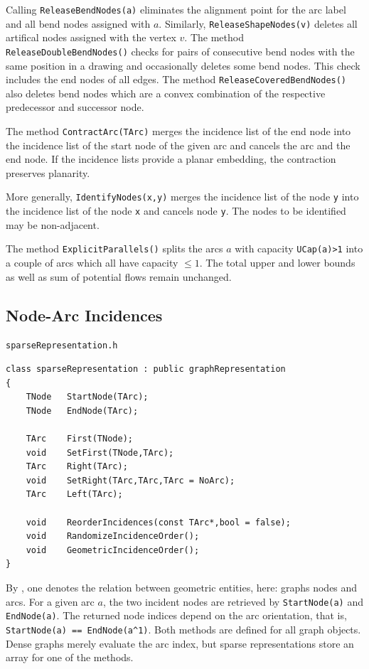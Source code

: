 \documentclass[a4paper,11pt,twoside]{book}
\begin{document}
\begin{multicols}{2}
Calling \verb/ReleaseBendNodes(a)/ eliminates the alignment point for the arc
label and all bend nodes assigned with $a$. Similarly,
\verb/ReleaseShapeNodes(v)/ deletes all artifical nodes assigned with the
vertex $v$. The method \verb/ReleaseDoubleBendNodes()/ checks for pairs of
consecutive bend nodes with the same position in a drawing and occasionally
deletes some bend nodes. This check includes the end nodes of all edges.
The method \verb/ReleaseCoveredBendNodes()/ also deletes bend nodes which
are a convex combination of the respective predecessor and successor node.

The method \verb/ContractArc(TArc)/ merges the incidence list of the end node
into the incidence list of the start node of the given arc and cancels the
arc and the end node. If the incidence lists provide a planar embedding, the
contraction preserves planarity.

More generally, \verb/IdentifyNodes(x,y)/ merges the incidence list of the
node \verb/y/ into the incidence list of the node \verb/x/ and cancels node
\verb/y/. The nodes to be identified may be non-adjacent.

The method \verb/ExplicitParallels()/ splits the arcs $a$ with capacity
\verb/UCap(a)>1/ into a couple of arcs which all have capacity $\leq 1$.
The total upper and lower bounds as well as sum of potential flows remain
unchanged.


\subsection{Node-Arc Incidences}
\label{slb_incidence_lists}
\myinclude\verb/sparseRepresentation.h/
\begin{mymethods}
\begin{verbatim}
class sparseRepresentation : public graphRepresentation
{
    TNode   StartNode(TArc);
    TNode   EndNode(TArc);

    TArc    First(TNode);
    void    SetFirst(TNode,TArc);
    TArc    Right(TArc);
    void    SetRight(TArc,TArc,TArc = NoArc);
    TArc    Left(TArc);

    void    ReorderIncidences(const TArc*,bool = false);
    void    RandomizeIncidenceOrder();
    void    GeometricIncidenceOrder();
}
\end{verbatim}
\end{mymethods}
By , one denotes the relation between geometric entities,
here: graphs nodes and arcs. For a given arc $a$, the two incident nodes
are retrieved by \verb/StartNode(a)/ and \verb/EndNode(a)/. The returned
node indices depend on the arc orientation, that is,
\verb/StartNode(a) == EndNode(a^1)/. Both methods are
defined for all graph objects. Dense graphs merely evaluate the arc index,
but sparse representations store an array for one of the methods.


\end{multicols}
\end{document}
